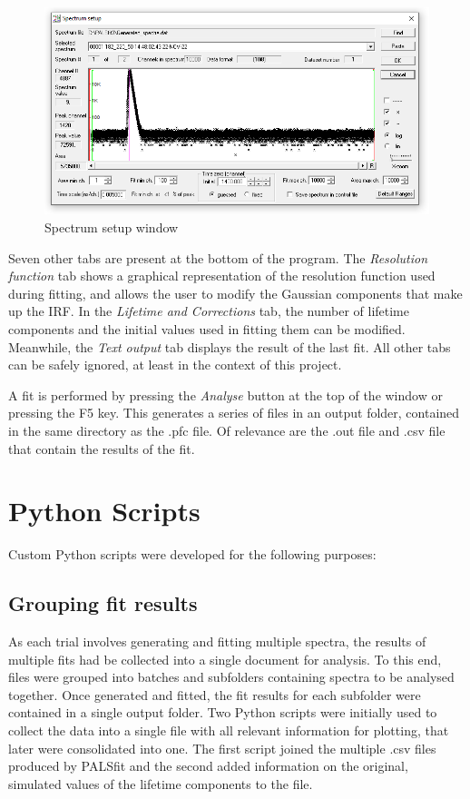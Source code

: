 \vfill

\begin{figure}[h]
     
    \includegraphics[width=0.6\linewidth]{SpecSetup.PNG}
    \caption{Spectrum setup window}
    \label{fig:SpecSet}
\end{figure}

Seven other tabs are present at the bottom of the program. The \textit{Resolution function} tab shows a graphical representation of the resolution function used during fitting, and allows the user to modify the Gaussian components that make up the IRF. In the \textit{Lifetime and Corrections} tab, the number of lifetime components and the initial values used in fitting them can be modified. Meanwhile, the \textit{Text output} tab displays the result of the last fit. All other tabs can be safely ignored, at least in the context of this project.

A fit is performed by pressing the \textit{Analyse} button at the top of the window or pressing the F5 key. This generates a series of files in an output folder, contained in the same directory as the .pfc file. Of relevance are the .out file and .csv file that contain the results of the fit.

\section{Python Scripts}

Custom Python scripts were developed for the following purposes:

\subsection{Grouping fit results}
As each trial involves generating and fitting multiple spectra, the results of multiple fits had be collected into a single document for analysis. To this end, files were grouped into batches and subfolders containing spectra to be analysed together. Once generated and fitted, the fit results for each subfolder were contained in a single output folder. Two Python scripts were initially used to collect the data into a single file with all relevant information for plotting, that later were consolidated into one. The first script joined the multiple .csv files produced by PALSfit and the second added information on the original, simulated values of the lifetime components to the file.

